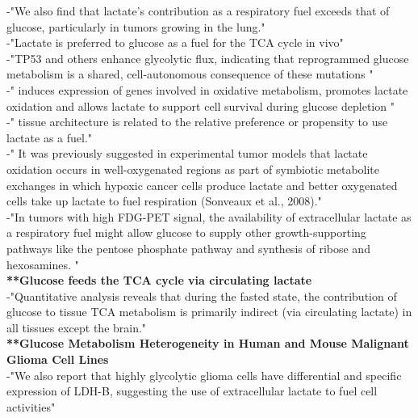 \documentclass[11pt,a4paper]{article}
\begin{document}
-"We also find that lactate's contribution as a respiratory fuel exceeds that of glucose, particularly in tumors growing in the lung."\\

-"Lactate is preferred to glucose as a fuel for the TCA cycle in vivo"\\

-"TP53 and others enhance glycolytic flux, indicating that reprogrammed glucose metabolism is a shared, cell-autonomous consequence of these mutations "\\

-" induces expression of genes involved in oxidative metabolism, promotes lactate oxidation and allows lactate to support cell survival during glucose depletion "\\

-" tissue architecture is related to the relative preference or propensity to use lactate as a fuel."\\

-" It was previously suggested in experimental tumor models that lactate oxidation occurs in well-oxygenated regions as part of symbiotic metabolite exchanges in which hypoxic cancer cells produce lactate and better oxygenated cells take up lactate to fuel respiration (Sonveaux et al., 2008)."\\

-"In tumors with high FDG-PET signal, the availability of extracellular lactate as a respiratory fuel might allow glucose to supply other growth-supporting pathways like the pentose phosphate pathway and synthesis of ribose and hexosamines. "\\



\textbf{**Glucose feeds the TCA cycle via circulating lactate}\\

-"Quantitative analysis reveals that during the fasted state, the contribution of glucose to tissue TCA metabolism is primarily indirect (via circulating lactate) in all tissues except the brain."\\


\textbf{**Glucose Metabolism Heterogeneity in Human and Mouse Malignant Glioma Cell Lines}\\

-"We also report that highly glycolytic glioma cells have differential and specific expression of LDH-B, suggesting the use of extracellular lactate to fuel cell activities"\\
\end{document}
